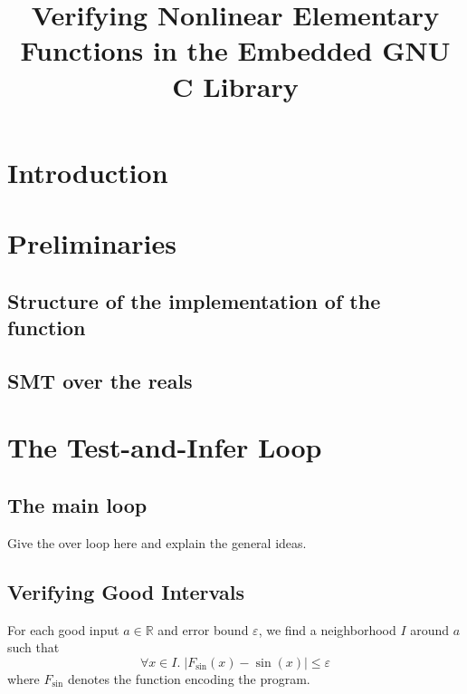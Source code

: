 \documentclass{acm_proc_article-sp}
\begin{document}
\title{Verifying Nonlinear Elementary Functions in the Embedded GNU C Library}

\maketitle
\begin{abstract}

\end{abstract}


\section{Introduction}



\section{Preliminaries}

\subsection{Structure of the implementation of the function}

\subsection{SMT over the reals}


\section{The Test-and-Infer Loop}

\subsection{The main loop}

Give the over loop here and explain the general ideas. 


\subsection{Verifying Good Intervals}

For each good input $a\in \mathbb{R}$ and error bound $\varepsilon$, we find a neighborhood $I$ around $a$ such that 
$$\forall x\in I.\; |F_{\sin}(x)-\sin(x)|\leq \varepsilon$$
where $F_{\sin}$ denotes the function encoding the program.  
\end{document}

